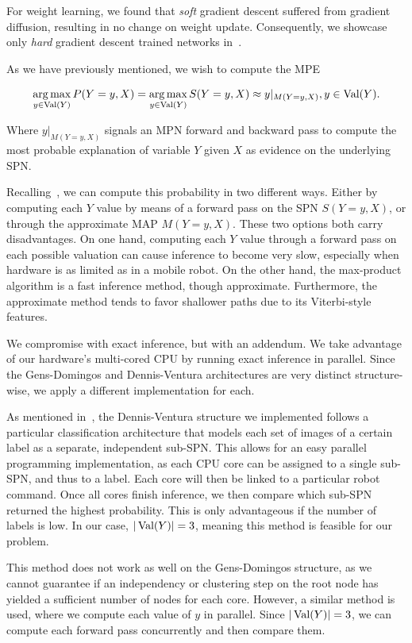 For weight learning, we found that \textit{soft} gradient descent suffered from gradient diffusion,
resulting in no change on weight update. Consequently, we showcase only \textit{hard} gradient
descent trained networks in~.

As we have previously mentioned, we wish to compute the MPE

\begin{equation}
  \operatorname*{arg\,max}_{y\in\operatorname*{\text{Val}}(Y)} P(Y=y,X)=\operatorname*{arg\,max}_{y\in\operatorname*{\text{Val}}(Y)}S(Y=y,X)\approx y|_{M(Y=y,X)}, y\in\operatorname*{\text{Val}}(Y).
\end{equation}

Where $y|_{M(Y=y,X)}$ signals an MPN forward and backward pass to compute the most probable
explanation of variable $Y$ given $X$ as evidence on the underlying SPN.

Recalling~, we can compute this probability in two different ways. Either
by computing each $Y$ value by means of a forward pass on the SPN $S(Y=y,X)$, or through the
approximate MAP $M(Y=y,X)$. These two options both carry disadvantages. On one hand, computing each
$Y$ value through a forward pass on each possible valuation can cause inference to become very
slow, especially when hardware is as limited as in a mobile robot. On the other hand, the
max-product algorithm is a fast inference method, though approximate. Furthermore, the approximate
method tends to favor shallower paths due to its Viterbi-style features.

We compromise with exact inference, but with an addendum. We take advantage of our hardware's
multi-cored CPU by running exact inference in parallel. Since the Gens-Domingos and Dennis-Ventura
architectures are very distinct structure-wise, we apply a different implementation for each.

As mentioned in~, the Dennis-Ventura structure we implemented follows a
particular classification architecture that models each set of images of a certain label as a
separate, independent sub-SPN. This allows for an easy parallel programming implementation, as each
CPU core can be assigned to a single sub-SPN, and thus to a label. Each core will then be linked to
a particular robot command. Once all cores finish inference, we then compare which sub-SPN returned
the highest probability. This is only advantageous if the number of labels is low. In our case,
$|\operatorname*{\text{Val}}(Y)|=3$, meaning this method is feasible for our problem.

This method does not work as well on the Gens-Domingos structure, as we cannot guarantee if
an independency or clustering step on the root node has yielded a sufficient number of nodes for
each core. However, a similar method is used, where we compute each value of $y$ in parallel. Since
$|\operatorname*{\text{Val}}(Y)|=3$, we can compute each forward pass concurrently and then compare them.

